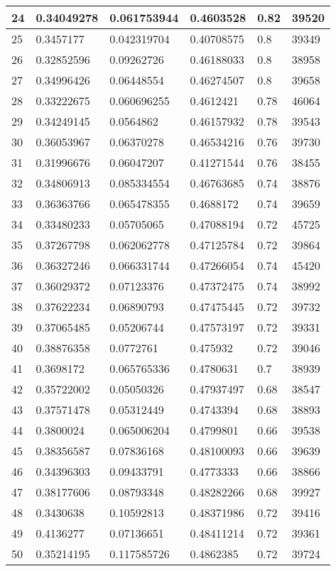\begin{longtable}{|l|l|l|l|l|l|}
24 & 0.34049278 & 0.061753944 & 0.4603528 & 0.82 & 39520 \\ \hline 
25 & 0.3457177 & 0.042319704 & 0.40708575 & 0.8 & 39349 \\ \hline 
26 & 0.32852596 & 0.09262726 & 0.46188033 & 0.8 & 38958 \\ \hline 
27 & 0.34996426 & 0.06448554 & 0.46274507 & 0.8 & 39658 \\ \hline 
28 & 0.33222675 & 0.060696255 & 0.4612421 & 0.78 & 46064 \\ \hline 
29 & 0.34249145 & 0.0564862 & 0.46157932 & 0.78 & 39543 \\ \hline 
30 & 0.36053967 & 0.06370278 & 0.46534216 & 0.76 & 39730 \\ \hline 
31 & 0.31996676 & 0.06047207 & 0.41271544 & 0.76 & 38455 \\ \hline 
32 & 0.34806913 & 0.085334554 & 0.46763685 & 0.74 & 38876 \\ \hline 
33 & 0.36363766 & 0.065478355 & 0.4688172 & 0.74 & 39659 \\ \hline 
34 & 0.33480233 & 0.05705065 & 0.47088194 & 0.72 & 45725 \\ \hline 
35 & 0.37267798 & 0.062062778 & 0.47125784 & 0.72 & 39864 \\ \hline 
36 & 0.36327246 & 0.066331744 & 0.47266054 & 0.74 & 45420 \\ \hline 
37 & 0.36029372 & 0.07123376 & 0.47372475 & 0.74 & 38992 \\ \hline 
38 & 0.37622234 & 0.06890793 & 0.47475445 & 0.72 & 39732 \\ \hline 
39 & 0.37065485 & 0.05206744 & 0.47573197 & 0.72 & 39331 \\ \hline 
40 & 0.38876358 & 0.0772761 & 0.475932 & 0.72 & 39046 \\ \hline 
41 & 0.3698172 & 0.065765336 & 0.4780631 & 0.7 & 38939 \\ \hline 
42 & 0.35722002 & 0.05050326 & 0.47937497 & 0.68 & 38547 \\ \hline 
43 & 0.37571478 & 0.05312449 & 0.4743394 & 0.68 & 38893 \\ \hline 
44 & 0.3800024 & 0.065006204 & 0.4799801 & 0.66 & 39538 \\ \hline 
45 & 0.38356587 & 0.07836168 & 0.48100093 & 0.66 & 39639 \\ \hline 
46 & 0.34396303 & 0.09433791 & 0.4773333 & 0.66 & 38866 \\ \hline 
47 & 0.38177606 & 0.08793348 & 0.48282266 & 0.68 & 39927 \\ \hline 
48 & 0.3430638 & 0.10592813 & 0.48371986 & 0.72 & 39416 \\ \hline 
49 & 0.4136277 & 0.07136651 & 0.48411214 & 0.72 & 39361 \\ \hline 
50 & 0.35214195 & 0.117585726 & 0.4862385 & 0.72 & 39724 \\ \hline 
\end{longtable}
